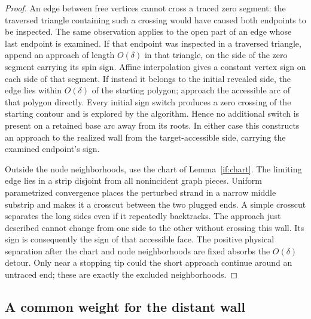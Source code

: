 \begin{proof}
An edge between free vertices cannot cross a traced zero segment:
the traversed triangle containing such a crossing would have caused
both endpoints to be inspected.  The same observation applies to
the open part of an edge whose last endpoint is examined.  If that
endpoint was inspected in a traversed triangle, append an approach
of length $O(\delta)$ in that triangle, on the side of the zero
segment carrying its spin sign.  Affine interpolation gives a
constant vertex sign on each side of that segment.  If instead it
belongs to the initial revealed side, the edge lies within
$O(\delta)$ of the starting polygon; approach the accessible arc
of that polygon directly.  Every initial sign switch produces a
zero crossing of the starting contour and is explored by the
algorithm.  Hence no additional switch is present on a retained
base arc away from its roots.  In either case this constructs an
approach to the realized wall from the target-accessible side,
carrying the examined endpoint's sign.

Outside the node neighborhoods, use the chart of
Lemma~\ref{if:chart}.  The limiting edge lies in a strip disjoint from
all nonincident graph pieces.  Uniform parametrized convergence
places the perturbed strand in a narrow middle substrip and makes
it a crosscut between the two plugged ends.  A simple crosscut
separates the long sides even if it repeatedly backtracks.  The
approach just described cannot change from one side to the other
without crossing this wall.  Its sign is consequently the sign of
that accessible face.  The positive physical separation after the
chart and node neighborhoods are fixed absorbs the $O(\delta)$
detour.  Only near a stopping tip could the short approach continue
around an untraced end; these are exactly the excluded neighborhoods.
\end{proof}

\subsection{A common weight for the distant wall}

